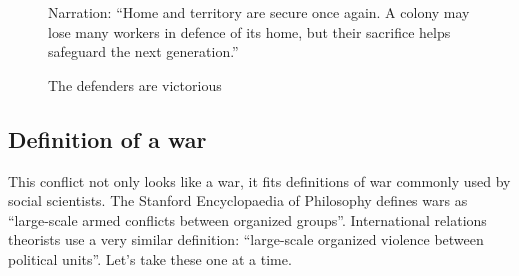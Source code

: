 \documentclass[
  letterpaper,
  DIV=11,
  numbers=noendperiod]{scrartcl}
\begin{document}
\begin{figure}
\begin{minipage}[t]{0.50\linewidth}
{{}

\caption{\label{fig-weaver-ants-6}Defenders go on the attack}

}

\end{minipage}%
\newline
\begin{minipage}[t]{0.50\linewidth}

{\centering 

Narration: ``Home and territory are secure once again. A colony may lose
many workers in defence of its home, but their sacrifice helps safeguard
the next generation.''

}

\end{minipage}%
%
\begin{minipage}[t]{0.50\linewidth}

{\centering 


\caption{\label{fig-weaver-ants-7}The defenders are victorious}

}

\end{minipage}%

\end{figure}

\hypertarget{definition-of-a-war}{%
\subsection{Definition of a war}\label{definition-of-a-war}}

This conflict not only looks like a war, it fits definitions of war
commonly used by social scientists. The Stanford Encyclopaedia of
Philosophy defines wars as ``large-scale armed conflicts between
organized groups''. International relations theorists use a very similar
definition: ``large-scale organized violence between political units''.
Let's take these one at a time.
\end{document}
